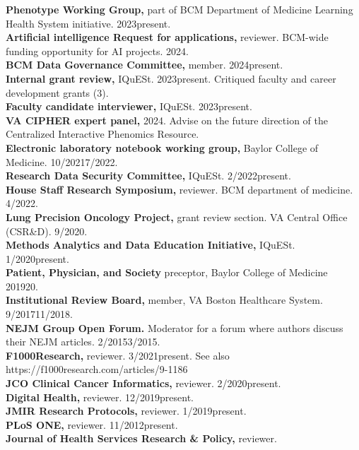 \documentclass[10pt]{article}
\begin{document}
\textbf{Phenotype Working Group,} part of BCM Department of Medicine
Learning Health System initiative. 2023\ndash{}present.\\
\textbf{Artificial intelligence Request for applications,} reviewer.
BCM-wide funding opportunity for AI projects. 2024.\\
\textbf{BCM Data Governance Committee,} member. 2024\ndash{}present.\\
\textbf{Internal grant review,} IQuESt. 2023\ndash{}present. Critiqued
faculty and career development grants (3).\\
\textbf{Faculty candidate interviewer,} IQuESt. 2023\ndash{}present.\\
\textbf{VA CIPHER expert panel,} 2024. Advise on the future direction
of the Centralized Interactive Phenomics Resource.\\
\textbf{Electronic laboratory notebook working group,} Baylor College
of Medicine. 10/2021\ndash{}7/2022.\\
\textbf{Research Data Security Committee,} IQuESt.
2/2022\ndash{}present.\\
\textbf{House Staff Research Symposium,} reviewer. BCM department of
medicine. 4/2022.\\
\textbf{Lung Precision Oncology Project,} grant review section. VA
Central Office  (CSR\&D). 9/2020.\\
\textbf{Methods Analytics and Data Education Initiative,} IQuESt.
1/2020\ndash{}present.\\
\textbf{Patient, Physician, and Society} preceptor, Baylor College of
Medicine 2019\ndash{}20.\\
\textbf{Institutional Review Board,} member, VA Boston Healthcare System.
9/2017\ndash{}11/2018.\\
\textbf{NEJM Group Open Forum.} Moderator for a forum where
authors discuss their NEJM articles. 2/2015\ndash{}3/2015.\\
\textbf{F1000Research,} reviewer. 3/2021\ndash{}present. See also
https://f1000research.com/articles/9-1186\\
\textbf{JCO Clinical Cancer Informatics,} reviewer. 2/2020\ndash{}present.\\
\textbf{Digital Health,} reviewer. 12/2019\ndash{}present.\\
\textbf{JMIR Research Protocols,} reviewer. 1/2019\ndash{}present.\\
\textbf{PLoS ONE,} reviewer. 11/2012\ndash{}present.\\
\textbf{Journal of Health Services Research \& Policy,} reviewer.
\end{document}
